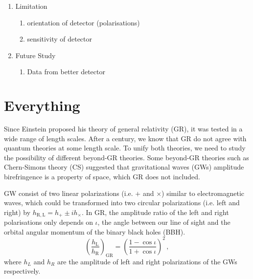 \documentclass[twocolumn]{aastex631}
\begin{document}
\begin{enumerate}
\begin{enumerate}
        \item Limitation
        \begin{enumerate}
            \item orientation of detector (polarisations)
            \item sensitivity of detector
        \end{enumerate}
        \item Future Study
        \begin{enumerate}
            \item Data from better detector
        \end{enumerate}
    \end{enumerate}
\end{enumerate}

\section{Everything}
Since Einstein proposed his theory of general relativity (GR), it was tested in a wide range of length scales.
After a century, we know that GR do not agree with quantum theories at some length scale.
To unify both theories, we need to study the possibility of different beyond-GR theories.
Some beyond-GR theories such as Chern-Simons theory (CS) suggested that gravitational waves (GWs) amplitude birefringence is a property of space,
which GR does not included.

GW consist of two linear polarizations (i.e. $+$ and $\times$) similar to electromagnetic waves,
which could be transformed into two circular polarizations (i.e. left and right) by $h_{\mathrm{R}, \mathrm{L}} = h_+ \pm i h_\times$.
In GR, the amplitude ratio of the left and right polarisations only depends on $\iota$,
the angle between our line of sight and the orbital angular momentum of the binary black holes (BBH).
\begin{equation}
    \left(\frac{h_\mathrm{L}}{h_\mathrm{R}}\right)_\mathrm{GR}=\left(\frac{1-\cos\iota}{1+\cos\iota}\right)^2\,,
\end{equation}where $h_L$ and $h_R$ are the amplitude of left and right polarizations of the GWs respectively.
\end{document}
